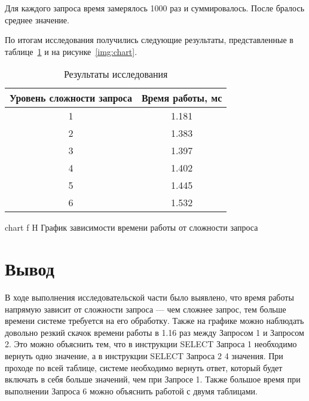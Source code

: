 Для каждого запроса время замерялось 1000 раз и суммировалось.
После бралось среднее значение.

По итогам исследования получились следующие результаты, представленные в таблице~\ref{table:res} и на рисунке~\ref{img:chart}.

\begin{table}[h]

	\centering
	\begin{tabular}{ | c | c | }
		\hline
		Уровень сложности запроса & Время работы, мс \\ \hline
		1 & 1.181 \\
		2 & 1.383 \\
		3 & 1.397 \\
		4 & 1.402 \\
		5 & 1.445 \\
		6 & 1.532 \\
		\hline
	\end{tabular}
	\caption{Результаты исследования}
				\label{table:res}
\end{table}



{chart} %
{f} %
{H} %
{\textwidth} %
{График зависимости времени работы от сложности запроса} %


\section*{Вывод}
В ходе выполнения исследовательской части было выявлено, что время работы напрямую зависит от сложности запроса --- чем сложнее запрос, тем больше времени системе требуется на его обработку.
Также на графике можно наблюдать довольно резкий скачок времени работы в 1.16 раз между Запросом 1 и Запросом 2.
Это можно объяснить тем, что в инструкции SELECT Запроса 1 необходимо вернуть одно значение, а в инструкции SELECT Запроса 2 4 значения.
При проходе по всей таблице, системе необходимо вернуть ответ, который будет включать в себя больше значений, чем при Запросе 1.
Также большое время при выполнении Запроса 6 можно объяснить работой с двумя таблицами.

 